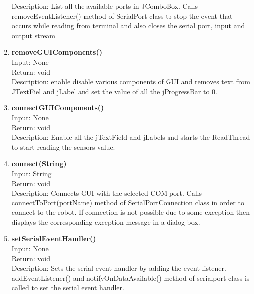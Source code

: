 \documentclass{article}
\begin{document}
\begin{enumerate}
		Description: List all the available ports in JComboBox. Calls removeEventListener() method of SerialPort class to stop the event that occurs while reading from terminal and also closes the serial port, input and output stream \vspace{0.5cm} \\
		\item \textbf{removeGUIComponents()} \vspace{0.25cm} \\
		Input: None \\
		Return: void \\
		Description: enable disable various components of GUI and removes text from JTextFiel and jLabel and set the value of all the jProgressBar to 0. \vspace{0.5cm} \\
		\item \textbf{connectGUIComponents()} \\
		Input: None \\
		Return: void \\
		Description: Enable all the jTextField and jLabels and starts the ReadThread to start reading the sensors value. \vspace{0.5cm} \\
		\item \textbf{connect(String)} \vspace{0.25cm} \\
		Input: String \\
		Return: void \\
		Description: Connects GUI with the selected COM port. Calls connectToPort(portName) method of SerialPortConnection class in order to connect to the robot. If connection is not possible due to some exception then displays the corresponding exception message in a dialog box. \vspace{0.5cm} \\
		\item \textbf{setSerialEventHandler()} \vspace{0.25cm} \\
		Input: None \\
		Return: void \\
		Description: Sets the serial event handler by adding the event listener.\\ addEventListener() and notifyOnDataAvailable() method of serialport class is called to set the serial event handler. \vspace{0.5cm} \\

\end{enumerate}
\end{document}
